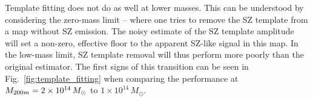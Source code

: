 Template fitting does not do as well at lower masses. 
This can be understood by considering  the zero-mass limit -- where one tries to remove the SZ template from a map without SZ emission. 
The noisy estimate of the SZ template amplitude will set a non-zero, effective floor to the apparent SZ-like signal in this map. 
In the low-mass limit, SZ template removal will thus perform more poorly than the original estimator. 
The first signs of this transition can be seen in Fig.~\ref{fig:template_fitting} when comparing the performance at $M_{200m} = 2\times 10^{14}\,M_{\odot}$ to   $1\times 10^{14}\,M_{\odot}$.


 
 



 
